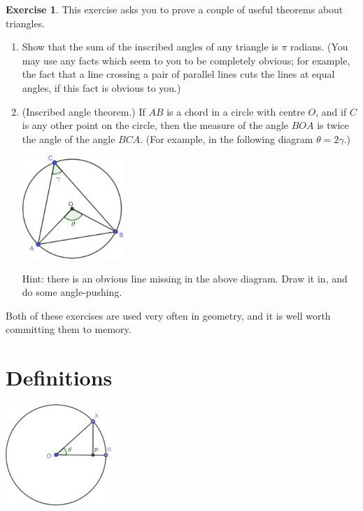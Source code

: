 \documentclass[a4paper,leqno]{article}
\numberwithin{equation}{section}
\theoremstyle{definition}
\newtheorem{exercise}[equation]{Exercise}
\theoremstyle{remark}
\begin{document}
\begin{exercise}
  This exercise asks you to prove a couple of useful theorems about triangles.
  \begin{enumerate}
    \item Show that the sum of the inscribed angles of any triangle is $ \pi $ radians. (You may use any facts
          which seem to you to be completely obvious; for example, the fact that a line crossing a pair of parallel
          lines cuts the lines at equal angles, if this fact is obvious to you.)
    \item (Inscribed angle theorem.) If $ AB $ is a chord in a circle with centre $ O $, and if $ C $ is any other
          point on the circle, then the measure of the angle $ BOA $ is twice the angle of the angle $ BCA $. (For
          example, in the following diagram $ \theta = 2\gamma $.)
          \begin{center}
            \includegraphics[width=0.3\textwidth]{inscribedanglethm}
          \end{center}
          Hint: there is an obvious line missing in the above diagram. Draw it in, and do some angle-pushing.
  \end{enumerate}
  Both of these exercises are used very often in geometry, and it is well worth committing them to memory.
\end{exercise}

\section{Definitions}
\begin{center}
  \includegraphics[width=0.3\textwidth]{fndefinitions}
\end{center}
\end{document}
